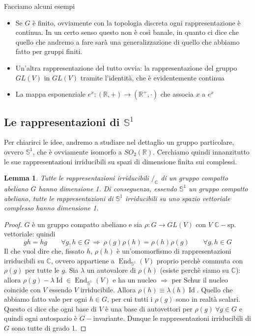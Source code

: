 \documentclass[11pt]{article}
\theoremstyle{plain}
\newtheorem{lemma}[thm]{Lemma}
\theoremstyle{definition}
\theoremstyle{remark}
\newcommand{\C}{\mathbb{C}}
\newcommand{\R}{\mathbb{R}}
\DeclareMathOperator{\End}{End}
\DeclareMathOperator{\Id}{Id}
\begin{document}
Facciamo alcuni esempi
\begin{itemize}
\item Se $G$ è finito, ovviamente con la topologia discreta ogni rappresentazione è continua. In un certo senso questo non è così banale, in quanto ci dice che quello che andremo a fare sarà una generalizzazione di quello che abbiamo fatto per gruppi finiti.
\item Un'altra rappresentazione del tutto ovvia: la rappresentazione del gruppo $GL(V)$ in $GL(V)$ tramite l'identità, che è evidentemente continua
\item La mappa esponenziale $e^x: (\R, +) \to (\R^+, \cdot )$ che associa $x$ a $e^x$
\end{itemize}



\subsection{Le rappresentazioni di $\mathbb{S}^1$}
Per chiarirci le idee, andremo a studiare nel dettaglio un gruppo particolare, ovvero $\mathbb{S}^1$, che è ovviamente isomorfo a $SO_2(\R)$. Cerchiamo quindi innanzitutto le sue rappresentazioni irriducibili su spazi di dimensione finita sui complessi.

\begin{lemma}
Tutte le rappresentazioni irriducibili $/_\C$ di un gruppo compatto abeliano $G$ hanno dimensione 1. Di conseguenza, essendo $\mathbb{S}^1$ un gruppo compatto abeliano, tutte le rappresentazioni di $\mathbb{S}^1$ irriducibili su uno spazio vettoriale complesso hanno dimensione 1.
\end{lemma}
\begin{proof}
  $G$ è un gruppo compatto abeliano e sia $\rho:G\rightarrow GL(V)$ con $V$ $\C-$sp. vettoriale: quindi
  \[ gh = hg \qquad \forall g,h \in G \ \Rightarrow\ \rho(g)\rho(h) = \rho(h)\rho(g) \qquad \forall g, h \in G\]
  Il che vuol dire che, fissato $h$, $\rho(h)$ è un'omomorfismo di rappresentazioni irriducibili su $\C$, ovvero appartiene a $\End_{\mathbb{S}^1}(V)$ proprio perchè commuta con $\rho(g)$ per tutte le $g$. Sia $\lambda$ un autovalore di $\rho(h)$ (esiste perchè siamo su $\C$): allora $\rho(g)-\lambda \Id\in \End_{\mathbb{S}^1}(V)$ e ha un nucleo $\Rightarrow$ per Schur il nucleo coincide con $V$ essendo $V$ irriducibile. Allora $\rho(h) \equiv \lambda(h) \Id$. Quello che abbiamo fatto vale per ogni $h \in G$, per cui tutti i $\rho(g) $ sono in realtà scalari. Questo ci dice che ogni base di $V$ è una base di autovettori per $\rho(g)\ \forall g\in G$ e quindi ogni autospazio è $G-$invariante. Dunque le rappresentazioni irriducibili di $G$ sono tutte di grado 1.
\end{proof}
\end{document}
